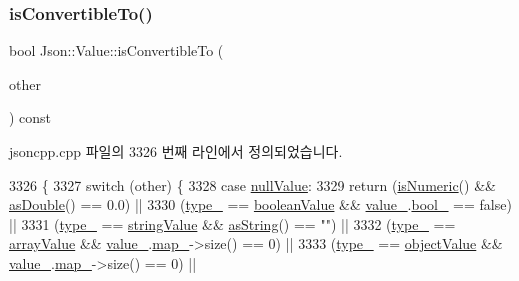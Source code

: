 \subsubsection{\texorpdfstring{is\+Convertible\+To()}{isConvertibleTo()}}
{\footnotesize\ttfamily bool Json\+::\+Value\+::is\+Convertible\+To (\begin{DoxyParamCaption}\item[{\hyperlink{namespace_json_a7d654b75c16a57007925868e38212b4e}{Value\+Type}}]{other }\end{DoxyParamCaption}) const}



jsoncpp.\+cpp 파일의 3326 번째 라인에서 정의되었습니다.


\begin{DoxyCode}
3326                                                  \{
3327   \textcolor{keywordflow}{switch} (other) \{
3328   \textcolor{keywordflow}{case} \hyperlink{namespace_json_a7d654b75c16a57007925868e38212b4ea7d9899633b4409bd3fc107e6737f8391}{nullValue}:
3329     \textcolor{keywordflow}{return} (\hyperlink{class_json_1_1_value_af961a000cd203c895e44c195ab39b866}{isNumeric}() && \hyperlink{class_json_1_1_value_afd24002a18aef907ad746b1cb9eda0a2}{asDouble}() == 0.0) ||
3330            (\hyperlink{class_json_1_1_value_abd222c2536dc88bf330dedcd076d2356}{type\_} == \hyperlink{namespace_json_a7d654b75c16a57007925868e38212b4ea14c30dbf4da86f7b809be299f671f7fd}{booleanValue} && \hyperlink{class_json_1_1_value_aef578244546212705b9f81eb84d7e151}{value\_}.\hyperlink{union_json_1_1_value_1_1_value_holder_a92edab1861dadbfefd8be5fd4285eefe}{bool\_} == \textcolor{keyword}{false}) ||
3331            (\hyperlink{class_json_1_1_value_abd222c2536dc88bf330dedcd076d2356}{type\_} == \hyperlink{namespace_json_a7d654b75c16a57007925868e38212b4ea804ef857affea2d415843c73f261c258}{stringValue} && \hyperlink{class_json_1_1_value_ae3f9b0d38f820ccdd8888aa92ea6e792}{asString}() == \textcolor{stringliteral}{""}) ||
3332            (\hyperlink{class_json_1_1_value_abd222c2536dc88bf330dedcd076d2356}{type\_} == \hyperlink{namespace_json_a7d654b75c16a57007925868e38212b4eadc8f264f36b55b063c78126b335415f4}{arrayValue} && \hyperlink{class_json_1_1_value_aef578244546212705b9f81eb84d7e151}{value\_}.\hyperlink{union_json_1_1_value_1_1_value_holder_a1e7a5b86d4f52234f55c847ad1ce389a}{map\_}->size() == 0) ||
3333            (\hyperlink{class_json_1_1_value_abd222c2536dc88bf330dedcd076d2356}{type\_} == \hyperlink{namespace_json_a7d654b75c16a57007925868e38212b4eae8386dcfc36d1ae897745f7b4f77a1f6}{objectValue} && \hyperlink{class_json_1_1_value_aef578244546212705b9f81eb84d7e151}{value\_}.\hyperlink{union_json_1_1_value_1_1_value_holder_a1e7a5b86d4f52234f55c847ad1ce389a}{map\_}->size() == 0) ||

\end{DoxyCode}
